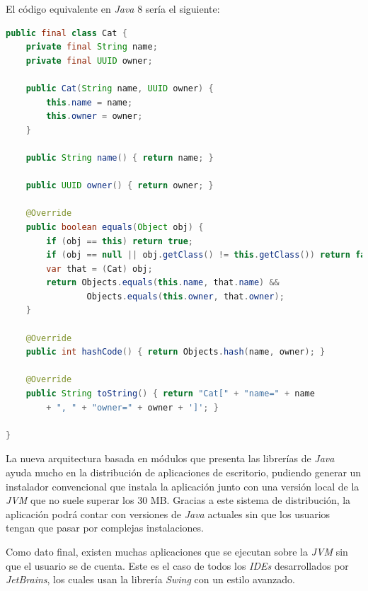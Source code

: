 \noindent El código equivalente en \textit{Java} 8 sería el siguiente:

\begin{lstlisting}[language=Java,style=java,frame=single,label={lst:java-comparacion-8}]
public final class Cat {
    private final String name;
    private final UUID owner;

    public Cat(String name, UUID owner) {
        this.name = name;
        this.owner = owner;
    }

    public String name() { return name; }

    public UUID owner() { return owner; }

    @Override
    public boolean equals(Object obj) {
        if (obj == this) return true;
        if (obj == null || obj.getClass() != this.getClass()) return false;
        var that = (Cat) obj;
        return Objects.equals(this.name, that.name) &&
                Objects.equals(this.owner, that.owner);
    }

    @Override
    public int hashCode() { return Objects.hash(name, owner); }

    @Override
    public String toString() { return "Cat[" + "name=" + name
        + ", " + "owner=" + owner + ']'; }

}
\end{lstlisting}

\noindent La nueva arquitectura basada en módulos que presenta las librerías de \textit{Java}
ayuda mucho en la distribución de aplicaciones de escritorio, pudiendo generar un instalador
convencional que instala la aplicación junto con una versión local de la \textit{JVM} que no
suele superar los 30 MB\cite{JPACKAGE}.
Gracias a este sistema de distribución, la aplicación podrá contar con versiones
de \textit{Java} actuales sin que los usuarios tengan que pasar por complejas instalaciones.

\noindent Como dato final, existen muchas aplicaciones que se ejecutan sobre la \textit{JVM}
sin que el usuario se de cuenta.
Este es el caso de todos los \textit{IDEs} desarrollados por \textit{JetBrains}, los cuales
usan la librería \textit{Swing} con un estilo avanzado.

